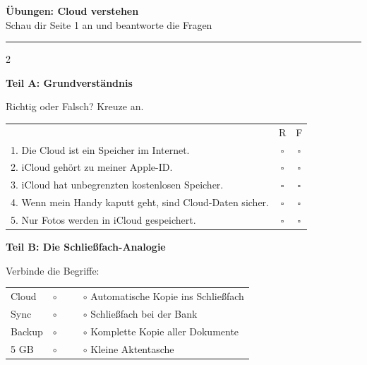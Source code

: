 \documentclass[a4paper,landscape,8pt]{extarticle}
\begin{document}
\newpage


\begin{center}
{\LARGE\bfseries Übungen: Cloud verstehen}\\[3pt]
{\normalsize Schau dir Seite 1 an und beantworte die Fragen}
\end{center}

\vspace{3mm}
\hrule
\vspace{4mm}

\begin{multicols}{2}

\textbf{\large Teil A: Grundverständnis}

Richtig oder Falsch? Kreuze an.

\vspace{2mm}

\renewcommand{\arraystretch}{1.6}
\begin{tabular}{@{}p{8cm}cc@{}}
& R & F \\
1. Die Cloud ist ein Speicher im Internet. & $\square$ & $\square$ \\
2. iCloud gehört zu meiner Apple-ID. & $\square$ & $\square$ \\
3. iCloud hat unbegrenzten kostenlosen Speicher. & $\square$ & $\square$ \\
4. Wenn mein Handy kaputt geht, sind Cloud-Daten sicher. & $\square$ & $\square$ \\
5. Nur Fotos werden in iCloud gespeichert. & $\square$ & $\square$ \\
\end{tabular}
\renewcommand{\arraystretch}{1}

\vspace{6mm}

\textbf{\large Teil B: Die Schließfach-Analogie}

Verbinde die Begriffe:

\vspace{2mm}

\renewcommand{\arraystretch}{1.8}
\begin{tabular}{@{}p{4cm}p{5cm}@{}}
Cloud & $\circ$ ~~~~ $\circ$ Automatische Kopie ins Schließfach \\
Sync & $\circ$ ~~~~ $\circ$ Schließfach bei der Bank \\
Backup & $\circ$ ~~~~ $\circ$ Komplette Kopie aller Dokumente \\
5 GB & $\circ$ ~~~~ $\circ$ Kleine Aktentasche \\
\end{tabular}
\renewcommand{\arraystretch}{1}


\end{multicols}
\end{document}
